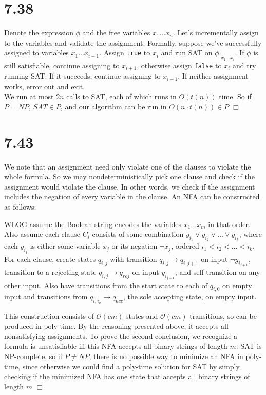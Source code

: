 \documentclass{article}
\newenvironment{myindentpar}[1]
  {\begin{list}{}
          {\setlength{\leftmargin}{#1}
          \setlength{\rightmargin}{#1}}
          \item[]
  }
  {\end{list}}
\begin{document}
\section*{7.38}
Denote the expression $\phi$ and the free variables $x_1 \dots x_n$. Let's incrementally assign to the variables and validate the assignment. Formally, suppose we've successfully assigned to variables $x_1 \dots x_{i-1}$. Assign \verb|true| to $x_i$ and run SAT on $\phi \big\vert_{x_1 \dots x_i}$. If $\phi$ is still satisfiable, continue assigning to $x_{i+1}$, otherwise assign \verb|false| to $x_i$ and try running SAT. If it succeeds, continue assigning to $x_{i+1}$. If neither assignment works, error out and exit.\\
We run at most $2n$ calls to SAT, each of which runs in $O(t(n))$ time. So if $P = NP$, $SAT \in P$, and our algorithm can be run in $O(n\cdot t(n)) \in P$ $\Box$

\section*{7.43}
We note that an assignment need only violate one of the clauses to violate the whole formula. So we may nondeterministically pick one clause and check if the assignment would violate the clause. In other words, we check if the assignment includes the negation of every variable in the clause. An NFA can be constructed as follows:
\begin{myindentpar}{1em}
WLOG assume the Boolean string encodes the variables $x_1 \dots x_m$ in that order. Also assume each clause $C_i$ consists of some combination $y_{i_1} \vee y_{i_2} \vee \dots \vee y_{i_k}$, where each $y_{i_j}$ is either some variable $x_j$ or its negation $\neg x_j$, ordered $i_1 < i_2 < \dots < i_k$. For each clause, create states $q_{i,j}$ with transition $q_{i,j} \to q_{i,j+1}$ on input $\neg y_{i_{j+1}}$, transition to a rejecting state $q_{i,j} \to q_{rej}$ on input $y_{i_{j+1}}$, and self-transition on any other input. Also have transitions from the start state to each of $q_{i,0}$ on empty input and transitions from $q_{i,i_k} \to q_{acc}$, the sole accepting state, on empty input.
\end{myindentpar}
This construction consists of $\mathcal{O}(cm)$ states and $\mathcal{O}(cm)$ transitions, so can be produced in poly-time. By the reasoning presented above, it accepts all nonsatisfying assignments. To prove the second conclusion, we recognize a formula is unsatisfiable iff this NFA accepts all binary strings of length $m$. SAT is NP-complete, so if $P \neq NP$, there is no possible way to minimize an NFA in poly-time, since otherwise we could find a poly-time solution for SAT by simply checking if the minimized NFA has one state that accepts all binary strings of length $m$ $\Box$
\end{document}
